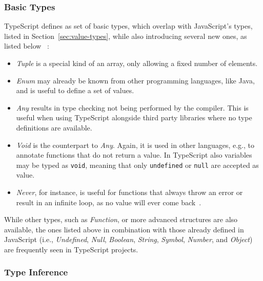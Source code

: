 \subsubsection{Basic Types}
\label{sec:ts-basic-types}

TypeScript defines as set of basic types, which overlap with JavaScript's types, listed in Section~\ref{sec:value-types}, while also introducing several new ones, as listed below ~\cite{TypeScriptHandbook:BasicTypes}:
\begin{itemize}
  \item \emph{Tuple} is a special kind of an array, only allowing a fixed number of elements.
  \item \emph{Enum} may already be known from other programming languages, like Java, and is useful to define a set of values.
  \item \emph{Any} results in type checking not being performed by the compiler. This is useful when using TypeScript alongside third party libraries where no type definitions are available.
  \item \emph{Void} is the counterpart to \emph{Any}. Again, it is used in other languages, e.g., to annotate functions that do not return a value. In TypeScript also variables may be typed as \texttt{void}, meaning that only \texttt{undefined} or \texttt{null} are accepted as value.
  \item \emph{Never}, for instance, is useful for functions that always throw an error or result in an infinite loop, as no value will ever come back~\cite{TypeScriptHandbook:BasicTypes}.
\end{itemize}
While other types, such as \emph{Function}, or more advanced structures are also available, the ones listed above in combination with those already defined in JavaScript (i.e., \emph{Undefined}, \emph{Null}, \emph{Boolean}, \emph{String}, \emph{Symbol}, \emph{Number}, and \emph{Object}) are frequently seen in TypeScript projects.

\subsubsection{Type Inference}
\label{sec:ts-type-inference}

